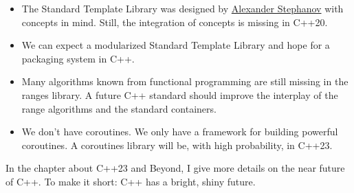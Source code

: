 \begin{itemize}
\item 
The Standard Template Library was designed by \href{https://en.wikipedia.org/wiki/Alexander_Stepanov}{Alexander Stephanov} with concepts in mind.
Still, the integration of concepts is missing in C++20.

\item 
We can expect a modularized Standard Template Library and hope for a packaging system in C++.

\item 
Many algorithms known from functional programming are still missing in the ranges library.
A future C++ standard should improve the interplay of the range algorithms and the standard containers.

\item 
We don’t have coroutines. We only have a framework for building powerful coroutines. A coroutines library will be, with high probability, in C++23.
\end{itemize}

In the chapter about C++23 and Beyond, I give more details on the near future of C++.
To make it short: C++ has a bright, shiny future.






